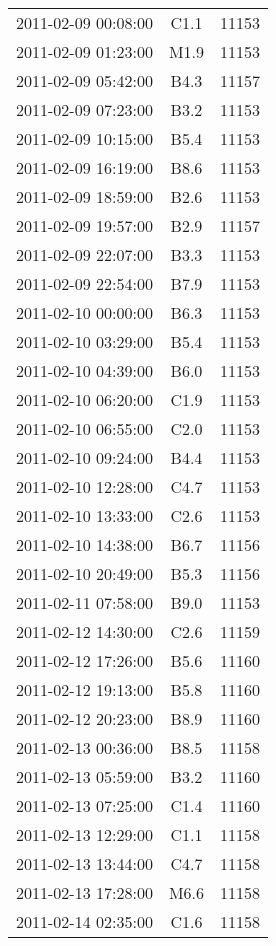\documentclass{article}
\begin{document}
\begin{table}
\begin{tabular}{c|c|c}
			2011-02-09 00:08:00 & C1.1 & 11153 \\ 
			2011-02-09 01:23:00 & M1.9 & 11153 \\ 
			2011-02-09 05:42:00 & B4.3 & 11157 \\ 
			2011-02-09 07:23:00 & B3.2 & 11153 \\ 
			2011-02-09 10:15:00 & B5.4 & 11153 \\ 
			2011-02-09 16:19:00 & B8.6 & 11153 \\ 
			2011-02-09 18:59:00 & B2.6 & 11153 \\ 
			2011-02-09 19:57:00 & B2.9 & 11157 \\ 
			2011-02-09 22:07:00 & B3.3 & 11153 \\ 
			2011-02-09 22:54:00 & B7.9 & 11153 \\ 
			2011-02-10 00:00:00 & B6.3 & 11153 \\ 
			2011-02-10 03:29:00 & B5.4 & 11153 \\ 
			2011-02-10 04:39:00 & B6.0 & 11153 \\ 
			2011-02-10 06:20:00 & C1.9 & 11153 \\ 
			2011-02-10 06:55:00 & C2.0 & 11153 \\ 
			2011-02-10 09:24:00 & B4.4 & 11153 \\ 
			2011-02-10 12:28:00 & C4.7 & 11153 \\ 
			2011-02-10 13:33:00 & C2.6 & 11153 \\ 
			2011-02-10 14:38:00 & B6.7 & 11156 \\ 
			2011-02-10 20:49:00 & B5.3 & 11156 \\ 
			2011-02-11 07:58:00 & B9.0 & 11153 \\ 
			2011-02-12 14:30:00 & C2.6 & 11159 \\ 
			2011-02-12 17:26:00 & B5.6 & 11160 \\ 
			2011-02-12 19:13:00 & B5.8 & 11160 \\ 
			2011-02-12 20:23:00 & B8.9 & 11160 \\ 
			2011-02-13 00:36:00 & B8.5 & 11158 \\ 
			2011-02-13 05:59:00 & B3.2 & 11160 \\ 
			2011-02-13 07:25:00 & C1.4 & 11160 \\ 
			2011-02-13 12:29:00 & C1.1 & 11158 \\ 
			2011-02-13 13:44:00 & C4.7 & 11158 \\ 
			2011-02-13 17:28:00 & M6.6 & 11158 \\ 
			2011-02-14 02:35:00 & C1.6 & 11158 \\ 

\end{tabular}
\end{table}
\end{document}
